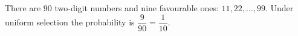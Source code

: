 There are $90$ two-digit numbers and nine favourable ones: $11,22,\ldots,99$. Under uniform selection the probability is $\dfrac{9}{90}=\boxed{\dfrac{1}{10}}$.

